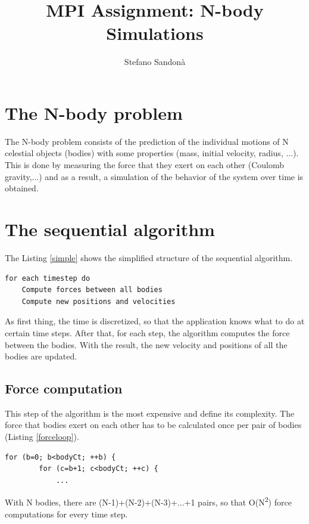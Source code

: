 \documentclass[a4paper]{article}
\begin{document}
\title{MPI Assignment: N-body Simulations}
\author{Stefano Sandonà}
\date{}
		
\maketitle

\section{The N-body problem}
\label{sec:nbody_problem}
The N-body problem consists of the prediction of the individual motions of N celestial objects (bodies) with some properties (mass, initial velocity, radius, ...). This is done by measuring the force that they exert on each other (Coulomb gravity,...) and as a result, a simulation of the behavior of the system over time is obtained.  

\section{The sequential algorithm}
\label{sec:seq_algo}
The Listing \ref{simple} shows the simplified structure of the sequential algorithm.
\begin{lstlisting}[label=simple, caption=general sequential algorithm]
for each timestep do
	Compute forces between all bodies
	Compute new positions and velocities
\end{lstlisting}

As first thing, the time is discretized, so that the application knows what to do at certain time steps. After that, for each step, the algorithm computes the force between the bodies. With the result, the new velocity and positions of all the bodies are updated.

\subsection{Force computation}
\label{sec:force_comp_seq}
This step of the algorithm is the most expensive and define its complexity.
The force that bodies exert on each other has to be calculated once per pair of bodies (Listing \ref{forceloop}).
\begin{lstlisting}[label=forceloop, caption=loop for the force calculation]
for (b=0; b<bodyCt; ++b) {
		for (c=b+1; c<bodyCt; ++c) {
			...
\end{lstlisting}
With N bodies, there are (N-1)+(N-2)+(N-3)+...+1 pairs, so that O(N\textsuperscript{2}) force computations for every time step.
\end{document}
